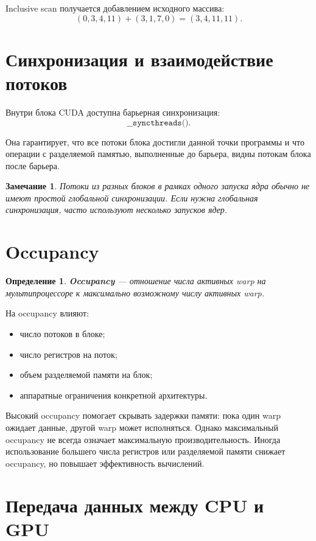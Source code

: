 \documentclass[12pt,a4paper]{article}
\newtheorem{definition}{Определение}
\newtheorem{remark}{Замечание}
\begin{document}
Inclusive scan получается добавлением исходного массива:
\[
    (0,3,4,11) + (3,1,7,0) = (3,4,11,11).
\]

\section{Синхронизация и взаимодействие потоков}

Внутри блока CUDA доступна барьерная синхронизация:
\[
    \texttt{\_\_syncthreads()}.
\]

Она гарантирует, что все потоки блока достигли данной точки программы и что операции с разделяемой памятью, выполненные до барьера, видны потокам блока после барьера.

\begin{remark}
Потоки из разных блоков в рамках одного запуска ядра обычно не имеют простой глобальной синхронизации. Если нужна глобальная синхронизация, часто используют несколько запусков ядер.
\end{remark}

\section{Occupancy}

\begin{definition}
\textbf{Occupancy} --- отношение числа активных warp на мультипроцессоре к максимально возможному числу активных warp.
\end{definition}

На occupancy влияют:

\begin{itemize}
    \item число потоков в блоке;
    \item число регистров на поток;
    \item объем разделяемой памяти на блок;
    \item аппаратные ограничения конкретной архитектуры.
\end{itemize}

Высокий occupancy помогает скрывать задержки памяти: пока один warp ожидает данные, другой warp может исполняться. Однако максимальный occupancy не всегда означает максимальную производительность. Иногда использование большего числа регистров или разделяемой памяти снижает occupancy, но повышает эффективность вычислений.

\section{Передача данных между CPU и GPU}
\end{document}
